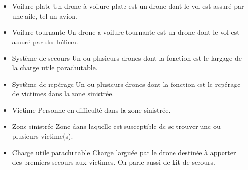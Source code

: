 \begin{itemize}
  \item Voilure plate\newline
Un drone à voilure plate est un drone dont le vol est assuré par une aile,
tel un avion.\newline

  \item Voilure tournante\newline
Un drone à voilure tournante est un drone dont le vol est assuré par des
hélices.\newline

  \item Système de secours\newline
Un ou plusieurs drones dont la fonction est le largage de la charge utile
parachutable.\newline

  \item Système de repérage\newline
Un ou plusieurs drones dont la fonction est le repérage de victimes dans la
zone sinistrée.\newline

  \item Victime\newline
Personne en difficulté dans la zone sinistrée.\newline

  \item Zone sinistrée\newline
Zone dans laquelle est susceptible de se trouver une ou plusieurs
victime(s).\newline

  \item Charge utile parachutable\newline
Charge larguée par le drone destinée à apporter des premiers secours aux
victimes. On parle aussi de kit de secours.\newline


\end{itemize}
